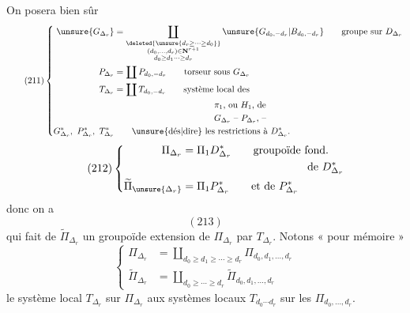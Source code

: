 On posera bien sûr
\deleted{\[
\unsure{\widetilde\Pi_{*\Delta_r}|\Pi_{\Delta_r}}=\coprod\Pi_{d_0,\ldots,d_r}
\]}
\[
\tag{211}
\left\{\begin{aligned}
\unsure{G_{\Delta_r}}&=
\coprod_{\substack{\deleted{\unsure{d_r\geq\cdots\geq d_0}}\\(d_0,\ldots,d_r)\in\mathbf N^{r+1}\\d_0\geq d_1\cdots\geq d_r}}
\unsure{G_{d_0,-d_r}|B_{d_0,-d_r}}\qquad\text{groupe sur }D_{\Delta_r}\\
P_{\Delta_r}&=\coprod P_{d_0,-d_r}\qquad\text{torseur sous }G_{\Delta_r}\\
T_{\Delta_r}&=\coprod T_{d_0,-d_r}\qquad\text{système local des}\\
&\hspace{4cm}\pi_1\text{, ou }H_1\text{, de}\\
&\hspace{4cm}G_{\Delta_r}\text{ -- }P_{\Delta_r}\text{, --}\\
G^*_{\Delta_r},\ P^*_{\Delta_r},\ T^*_{\Delta_r}&\qquad\unsure{\text{dés}|\text{dire}}\ \text{les restrictions à }D^*_{\Delta_r}.
\end{aligned}\right.
\]
\[
\tag{212}
\left\{\begin{aligned}
\Pi_{\Delta_r}&=\Pi_1D^*_{\Delta_r}\qquad\text{groupoïde fond.}\\
&\hspace{4cm}\text{de }D^*_{\Delta_r}\\
\widetilde\Pi_{\unsure{\Delta_r}}&=\Pi_1P^*_{\Delta_r}\qquad\text{et de }P^*_{\Delta_r}
\end{aligned}\right.
\]
donc on a
\[
(213)
\]
qui fait de $\widetilde\Pi_{\Delta_r}$ un groupoïde
extension de $\Pi_{\Delta_r}$ par $T_{\Delta_r}$.
Notons « pour mémoire »
\[
\tag{214}
\left\{\begin{aligned}
\Pi_{\Delta_r}&=\coprod_{d_0\geq d_1\geq\cdots\geq d_r}\Pi_{d_0,d_1,\ldots,d_r}\\
\widetilde\Pi_{\Delta_r}&=\coprod_{d_0\geq\cdots\geq d_r}\widetilde\Pi_{d_0,d_1,\ldots,d_r}
\end{aligned}\right.
\]
le système local $T_{\Delta_r}$ sur $\Pi_{\Delta_r}$ 
 aux systèmes locaux
$T_{d_0\cdots d_r}$ sur les $\Pi_{d_0,\ldots,d_r}$.

